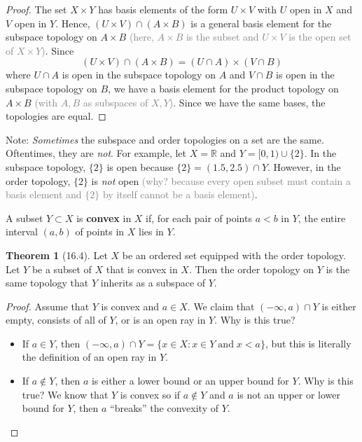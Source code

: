 \documentclass{article}
\newcommand{\nline}{\vspace*{0.5\baselineskip}}
\newcommand{\com}[1]{\textcolor{grey}{#1}}
\theoremstyle{definition}
\newtheorem{theorem}{Theorem}[subsection]
\begin{document}
\begin{flushleft}
\begin{proof}
The set $X \times Y$ has basis elements of the form $U \times V$ with $U$ open in $X$ and $V$ open in $Y$. Hence, $(U \times V) \cap (A \times B)$ is a general basis element for the subspace topology on $A \times B$ \com{(here, $A \times B$ is the subset and $U \times V$ is the open set of $X \times Y$)}. Since
\[
(U \times V) \cap (A \times B) = (U \cap A) \times (V \cap B)
\]
where $U \cap A$ is open in the subspace topology on $A$ and $V \cap B$ is open in the subspace topology on $B$, we have a basis element for the product topology on $A \times B$ \com{(with $A, B$ as subspaces of $X, Y$)}. Since we have the same bases, the topologies are equal.
\end{proof}

Note: \textit{Sometimes} the subspace and order topologies on a set are the same. Oftentimes, they are \textit{not}. For example, let $X = \mathbb{R}$ and $Y = [0,1) \cup \{2\}$. In the subspace topology, $\{2\}$ is open because $\{2\} = (1.5, 2.5) \cap Y$. However, in the order topology, $\{2\}$ is \textit{not} open \com{(why? because every open subset must contain a basis element and $\{2\}$ by itself cannot be a basis element)}.

\nline

A subset $Y \subset X$ is \textbf{convex} in $X$ if, for each pair of points $a < b$ in $Y$, the entire interval $(a,b)$ of points in $X$ lies in $Y$.

\begin{theorem}[16.4]
Let $X$ be an ordered set equipped with the order topology. Let $Y$ be a subset of $X$ that is convex in $X$. Then the order topology on $Y$ is the same topology that $Y$ inherits as a subspace of $Y$.
\end{theorem}

\begin{proof}
Assume that $Y$ is convex and $a \in X$. We claim that $(-\infty, a) \cap Y$ is either empty, consists of all of $Y$, or is an open ray in $Y$. Why is this true?
\begin{itemize}
    \item If $a \in Y$, then $(-\infty, a) \cap Y = \{ x \in X : x \in Y \; \text{and} \; x < a \}$, but this is literally the definition of an open ray in $Y$.
    \item If $a \notin Y$, then $a$ is either a lower bound or an upper bound for $Y$. Why is this true? We know that $Y$ is convex so if $a \notin Y$ and $a$ is not an upper or lower bound for $Y$, then $a$ ``breaks'' the convexity of $Y$.


\end{itemize}
\end{proof}
\end{flushleft}
\end{document}
